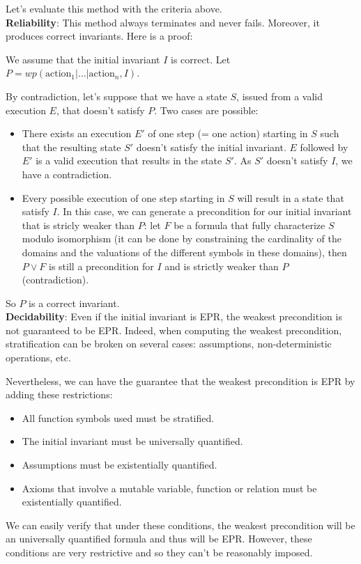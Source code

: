 \documentclass[11pt,a4paper,oldfontcommands,openany]{memoir}
\begin{document}
    Let's evaluate this method with the criteria above.\\
    
    \textbf{Reliability}: This method always terminates and never fails. Moreover, it produces correct invariants. Here is a proof:

    We assume that the initial invariant \(I\) is correct. Let \(P = wp(\text{action}_1|\ldots|\text{action}_n,I)\).

    By contradiction, let's suppose that we have a state \(S\), issued from a valid execution \(E\), that doesn't satisfy \(P\).
    Two cases are possible:
    \begin{itemize}
        \item There exists an execution \(E'\) of one step (= one action) starting in \(S\) such that the resulting state \(S'\) doesn't satisfy the initial invariant.
        \(E\) followed by \(E'\) is a valid execution that results in the state \(S'\). As \(S'\) doesn't satisfy \(I\), we have a contradiction.
        \item Every possible execution of one step starting in \(S\) will result in a state that satisfy \(I\).
        In this case, we can generate a precondition for our initial invariant that is stricly weaker than \(P\):
        let \(F\) be a formula that fully characterize \(S\) modulo isomorphism (it can be done by constraining the cardinality of the domains and the valuations of the different symbols in these domains),
        then \(P \lor F\) is still a precondition for \(I\) and is strictly weaker than \(P\) (contradiction). 
    \end{itemize}

    So \(P\) is a correct invariant.\\

    \textbf{Decidability}: Even if the initial invariant is EPR, the weakest precondition is not guaranteed to be EPR.
    Indeed, when computing the weakest precondition, stratification can be broken on several cases: assumptions, non-deterministic operations, etc.

    Nevertheless, we can have the guarantee that the weakest precondition is EPR by adding these restrictions:
    \begin{itemize}
        \item All function symbols used must be stratified.
        \item The initial invariant must be universally quantified.
        \item Assumptions must be existentially quantified.
        \item Axioms that involve a mutable variable, function or relation must be existentially quantified.
    \end{itemize}
    We can easily verify that under these conditions, the weakest precondition will be an universally quantified formula
    and thus will be EPR. However, these conditions are very restrictive and so they can't be reasonably imposed.
    \\
\end{document}
